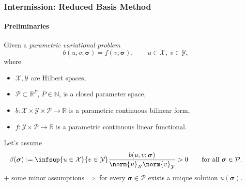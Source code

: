 \begin{frame}[t]
    \frametitle{Intermission: Reduced Basis Method}
    \framesubtitle{Preliminaries}

    Given a \emph{parametric variational problem}
    \begin{equation}
        b(u, v; \bm \sigma) = f(v; \bm \sigma), \qquad u \in \mathcal X,~v \in \mathcal Y,
    \end{equation}
    where
    \begin{itemize}
        \item $\mathcal X, \mathcal Y$ are Hilbert spaces,
        \item $\mathcal P \subset \mathbb{R}^{P}$, $P \in \mathbb{N}$, is a closed parameter space,
        \item $b \colon \mathcal X \times \mathcal Y \times \mathcal P \to \mathbb{R}$ is a parametric continuous bilinear form,
        \item $f \colon \mathcal Y \times \mathcal P \to \mathbb{R}$ is a parametric continuous linear functional.
    \end{itemize}

    Let's assume
    \begin{equation}
        \beta(\bm \sigma) := \infsup{u \in \mathcal X}{v \in \mathcal Y} \frac{b(u, v; \bm \sigma)}{\norm{u}_{\mathcal X}\norm{v}_{\mathcal Y}}  > 0 \qquad \text{for all } \bm \sigma \in \mathcal P.
    \end{equation}
    $+$ some minor assumptions $\Rightarrow$ for every $\bm \sigma \in \mathcal P$ exists a unique solution $u(\bm \sigma)$.
\end{frame}

